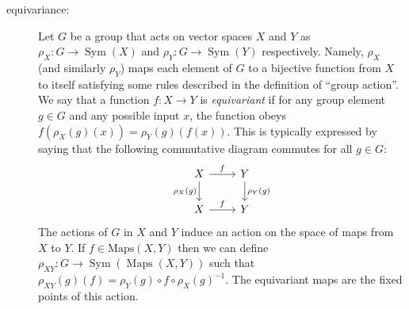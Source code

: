 \documentclass{article} %
\begin{document}
\begin{description}
\item[equivariance:]
  Let $G$ be a group that acts on vector spaces $X$ and $Y$ as $\rho_X:G\to \operatorname{Sym}(X)$ and $\rho_Y:G\to \operatorname{Sym}(Y)$ respectively.
  Namely, $\rho_X$ (and similarly $\rho_Y$) maps each element of $G$ to a bijective function from $X$ to itself satisfying some rules described in the definition of ``group action''.
  We say that a function $f:X\to Y$ is \emph{equivariant} if for any group element $g\in G$ and any possible input $x$, the function obeys $f( \rho_X(g)(x)) = \rho_Y(g)(f(x))$.
  This is typically expressed by saying that the following commutative diagram commutes for all $g\in G$:
  \begin{equation}
    \begin{tikzcd}[every label/.append ]
      {X}\arrow[r, "f"] \arrow[d,"\rho_X(g)",swap] & {Y}  \arrow[d,"\rho_Y(g)"]\\
      {X} \arrow[r, "f"]  & {Y} 
    \end{tikzcd}
  \end{equation}
  The actions of $G$ in $X$ and $Y$ induce an action on the space of maps from $X$ to $Y$. If $f\in \text{Maps}(X,Y)$ then we can define $\rho_{XY}: G \to \operatorname{Sym}(\operatorname{Maps}(X,Y))$ such that $\rho_{XY}(g)(f) = \rho_Y(g)\circ f \circ \rho_X(g)^{-1}$.
  The equivariant maps are the fixed points of this action.


\end{description}
\end{document}
